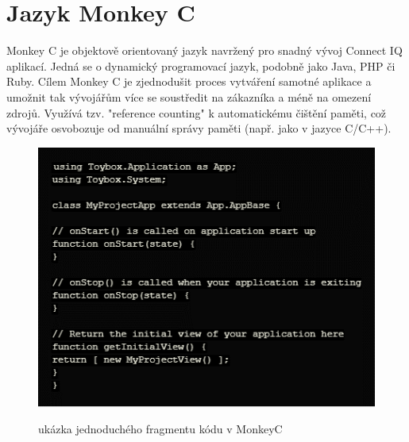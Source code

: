 \chapter{Jazyk Monkey C}
Monkey C \cite{monkeyc_2021} je objektově orientovaný jazyk navržený pro snadný vývoj Connect IQ aplikací. Jedná se o dynamický programovací jazyk, podobně jako Java, PHP či Ruby. Cílem Monkey C je zjednodušit proces vytváření samotné aplikace a umožnit tak vývojářům více se soustředit na zákazníka a méně na omezení zdrojů. Využívá tzv. "reference counting" k automatickému čištění paměti, což vývojáře osvobozuje od manuální správy paměti (např. jako v jazyce C/C++).
\\
\begin{figure}
	\centering
	\includegraphics{images/code_snippet}
	\\
	\caption{ukázka jednoduchého fragmentu kódu v MonkeyC}
	\label{img:monkeyC_Fragment}
\end{figure}

\endinput